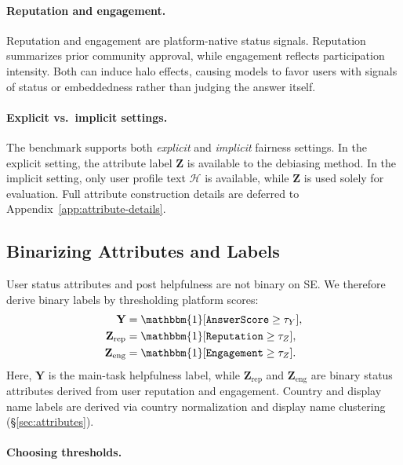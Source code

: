 \documentclass[11pt]{article}
\newcommand{\rv}[1]{\mathbf{#1}}
\begin{document}
\paragraph{Reputation and engagement.}
Reputation and engagement are platform-native status signals. Reputation summarizes prior community approval, while engagement reflects participation intensity. Both can induce halo effects, causing models to favor users with signals of status or embeddedness rather than judging the answer itself.

\paragraph{Explicit vs.\ implicit settings.}
The benchmark supports both \emph{explicit} and \emph{implicit} fairness settings. In the explicit setting, the attribute label $\rv{Z}$ is available to the debiasing method. In the implicit setting, only user profile text $\mathcal{H}$ is available, while $\rv{Z}$ is used solely for evaluation. 
Full attribute construction details are deferred to Appendix~\ref{app:attribute-details}.












\subsection{Binarizing Attributes and Labels}
\label{sec:label-construction}

User status attributes and post helpfulness are not binary on SE. We therefore derive binary labels by thresholding platform scores:
\[
\begin{aligned}
\rv{Y} &= \mathbbm{1}[\texttt{AnswerScore} \ge \tau_Y], \\
\rv{Z}_{\text{rep}} &= \mathbbm{1}[\texttt{Reputation} \ge \tau_Z], \\
\rv{Z}_{\text{eng}} &= \mathbbm{1}[\texttt{Engagement} \ge \tau_Z].
\end{aligned}
\]
Here, $\rv{Y}$ is the main-task helpfulness label, while $\rv{Z}_{\text{rep}}$ and $\rv{Z}_{\text{eng}}$ are binary status attributes derived from user reputation and engagement. Country and display name labels are derived via country normalization and display name clustering (\S\ref{sec:attributes}).

\paragraph{Choosing thresholds.}
\end{document}
